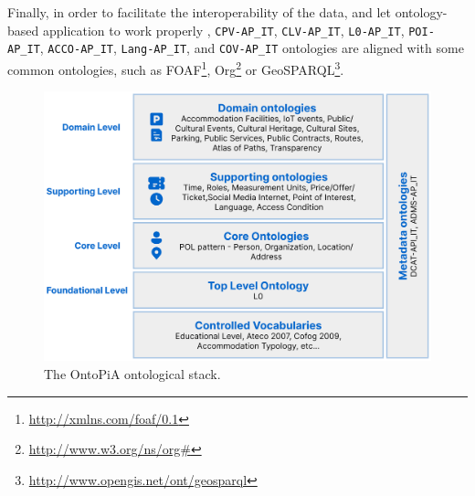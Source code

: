 Finally, in order to facilitate the interoperability of the data, and let ontology-based application to work properly \cite{euzenat2008ontology}, \verb#CPV-AP_IT#, \verb#CLV-AP_IT#, \verb#L0-AP_IT#, \verb#POI-AP_IT#, \verb#ACCO-AP_IT#, \verb#Lang-AP_IT#, and \verb#COV-AP_IT# ontologies are aligned with some common ontologies, such as FOAF\footnote{\url{http://xmlns.com/foaf/0.1}}, Org\footnote{\url{http://www.w3.org/ns/org\#}} or GeoSPARQL\footnote{\url{http://www.opengis.net/ont/geosparql}}.

\begin{figure}[!ht]
  \centering
  \includegraphics[width=0.8\columnwidth]{images/ontopia/ontopia-stack}
  \caption{The OntoPiA ontological stack.}
  \label{fig:ontopia-stack}
\end{figure}

